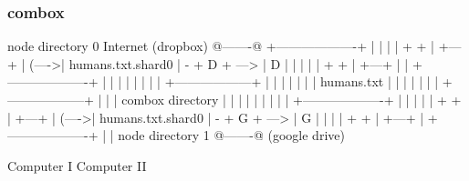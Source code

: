 \begin{frame}[fragile]
  \frametitle{combox}

  {\tiny
  \begin{semiverbatim}

         node directory 0                Internet
         (dropbox)                       @-------@
        +-------------------+            |       |
        |                   |    + +     | +---+ |
  (---->| humans.txt.shard0 | - + D + ---> | D | |
  |     |                   |    + +     | +---+ |
  |     +-------------------+            |       |
  |                                      |       |
  |                                      |       |
 +------------------+                    |       |
 |                  |                    |       |
 |  humans.txt      |                    |       |
 |                  |                    |       |
 +------------------+                    |       |
  |  combox directory                    |       |
  |                                      |       |
  |                                      |       |
  |     +-------------------+            |       |
  |     |                   |    + +     | +---+ |
  (---->| humans.txt.shard0 | - + G + ---> | G | |
        |                   |    + +     | +---+ |
        +-------------------+            |       |
         node directory 1                @-------@
         (google drive)

  Computer I                                                                    Computer II
  \end{semiverbatim}
  }

\end{frame}



